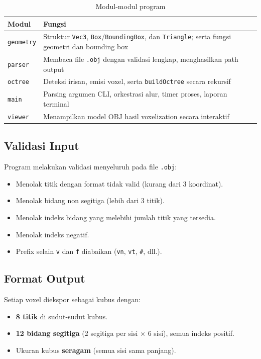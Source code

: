 \documentclass{article}
\begin{document}
\begin{table}[H]
\centering
\caption{Modul-modul program}
\begin{tabular}{lp{9cm}}
\toprule
\textbf{Modul} & \textbf{Fungsi} \\
\midrule
\texttt{geometry} & Struktur \texttt{Vec3}, \texttt{Box}/\texttt{BoundingBox}, dan \texttt{Triangle}; serta fungsi geometri dan bounding box \\
\texttt{parser}   & Membaca file \texttt{.obj} dengan validasi lengkap, menghasilkan path output \\
\texttt{octree}   & Deteksi irisan, emisi voxel, serta \texttt{buildOctree} secara rekursif \\
\texttt{main}     & Parsing argumen CLI, orkestrasi alur, timer proses, laporan terminal \\
\texttt{viewer}   & Menampilkan model OBJ hasil voxelization secara interaktif  \\
\bottomrule
\end{tabular}
\end{table}

\subsection{Validasi Input}

Program melakukan validasi menyeluruh pada file \texttt{.obj}:
\begin{itemize}
    \item Menolak titik dengan format tidak valid (kurang dari 3 koordinat).
    \item Menolak bidang non segitiga (lebih dari 3 titik).
    \item Menolak indeks bidang yang melebihi jumlah titik yang tersedia.
    \item Menolak indeks negatif.
    \item Prefix selain \texttt{v} dan \texttt{f} diabaikan (\texttt{vn}, \texttt{vt}, \texttt{\#}, dll.).
\end{itemize}

\subsection{Format Output}

Setiap voxel diekspor sebagai kubus dengan:
\begin{itemize}
    \item \textbf{8 titik} di sudut-sudut kubus.
    \item \textbf{12 bidang segitiga} (2 segitiga per sisi $\times$ 6 sisi), semua indeks positif.
    \item Ukuran kubus \textbf{seragam} (semua sisi sama panjang).
\end{itemize}
\end{document}
